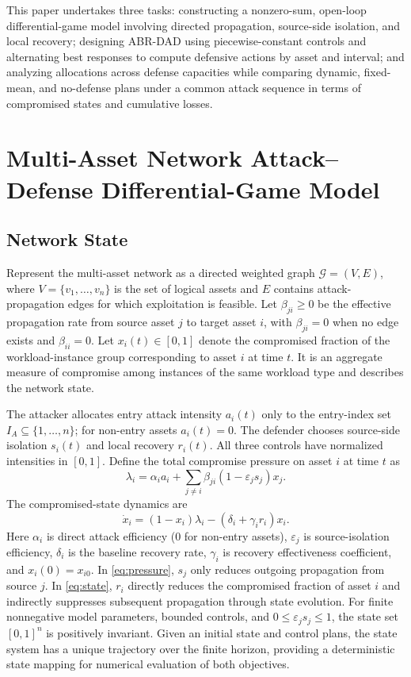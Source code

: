 \documentclass[conference,letterpaper]{IEEEtran}
\begin{document}
This paper undertakes three tasks: constructing a nonzero-sum, open-loop differential-game model involving directed propagation, source-side isolation, and local recovery; designing ABR-DAD using piecewise-constant controls and alternating best responses to compute defensive actions by asset and interval; and analyzing allocations across defense capacities while comparing dynamic, fixed-mean, and no-defense plans under a common attack sequence in terms of compromised states and cumulative losses.

\section{Multi-Asset Network Attack--Defense Differential-Game Model}
\subsection{Network State}
Represent the multi-asset network as a directed weighted graph $\mathcal{G}=(V,E)$, where $V=\{v_1,\ldots,v_n\}$ is the set of logical assets and $E$ contains attack-propagation edges for which exploitation is feasible. Let $\beta_{ji}\geq0$ be the effective propagation rate from source asset $j$ to target asset $i$, with $\beta_{ji}=0$ when no edge exists and $\beta_{ii}=0$. Let $x_i(t)\in[0,1]$ denote the compromised fraction of the workload-instance group corresponding to asset $i$ at time $t$. It is an aggregate measure of compromise among instances of the same workload type and describes the network state.

The attacker allocates entry attack intensity $a_i(t)$ only to the entry-index set $I_A\subseteq\{1,\ldots,n\}$; for non-entry assets $a_i(t)=0$. The defender chooses source-side isolation $s_i(t)$ and local recovery $r_i(t)$. All three controls have normalized intensities in $[0,1]$. Define the total compromise pressure on asset $i$ at time $t$ as
\begin{equation}\label{eq:pressure}
\lambda_i=\alpha_i a_i+\sum_{j\ne i}\beta_{ji}(1-\varepsilon_j s_j)x_j.
\end{equation}
The compromised-state dynamics are
\begin{equation}\label{eq:state}
\dot x_i=(1-x_i)\lambda_i-(\delta_i+\gamma_i r_i)x_i.
\end{equation}
Here $\alpha_i$ is direct attack efficiency ($0$ for non-entry assets), $\varepsilon_j$ is source-isolation efficiency, $\delta_i$ is the baseline recovery rate, $\gamma_i$ is recovery effectiveness coefficient, and $x_i(0)=x_{i0}$. In \eqref{eq:pressure}, $s_j$ only reduces outgoing propagation from source $j$. In \eqref{eq:state}, $r_i$ directly reduces the compromised fraction of asset $i$ and indirectly suppresses subsequent propagation through state evolution. For finite nonnegative model parameters, bounded controls, and $0\leq\varepsilon_js_j\leq1$, the state set $[0,1]^n$ is positively invariant. Given an initial state and control plans, the state system has a unique trajectory over the finite horizon, providing a deterministic state mapping for numerical evaluation of both objectives.
\end{document}
